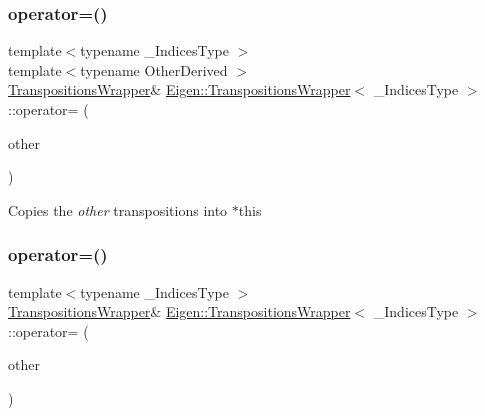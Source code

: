 \subsubsection{\texorpdfstring{operator=()}{operator=()}\hspace{0.1cm}{\footnotesize\ttfamily [1/2]}}
{\footnotesize\ttfamily template$<$typename \+\_\+\+Indices\+Type $>$ \\
template$<$typename Other\+Derived $>$ \\
\mbox{\hyperlink{class_eigen_1_1_transpositions_wrapper}{Transpositions\+Wrapper}}\& \mbox{\hyperlink{class_eigen_1_1_transpositions_wrapper}{Eigen\+::\+Transpositions\+Wrapper}}$<$ \+\_\+\+Indices\+Type $>$\+::operator= (\begin{DoxyParamCaption}\item[{const \mbox{\hyperlink{class_eigen_1_1_transpositions_base}{Transpositions\+Base}}$<$ Other\+Derived $>$ \&}]{other }\end{DoxyParamCaption})\hspace{0.3cm}{\ttfamily [inline]}}

Copies the {\itshape other} transpositions into {\ttfamily $\ast$this} \mbox{\label{class_eigen_1_1_transpositions_wrapper_acb74132efbe10876525cdc3d35c2d382}} 
\subsubsection{\texorpdfstring{operator=()}{operator=()}\hspace{0.1cm}{\footnotesize\ttfamily [2/2]}}
{\footnotesize\ttfamily template$<$typename \+\_\+\+Indices\+Type $>$ \\
\mbox{\hyperlink{class_eigen_1_1_transpositions_wrapper}{Transpositions\+Wrapper}}\& \mbox{\hyperlink{class_eigen_1_1_transpositions_wrapper}{Eigen\+::\+Transpositions\+Wrapper}}$<$ \+\_\+\+Indices\+Type $>$\+::operator= (\begin{DoxyParamCaption}\item[{const \mbox{\hyperlink{class_eigen_1_1_transpositions_wrapper}{Transpositions\+Wrapper}}$<$ \+\_\+\+Indices\+Type $>$ \&}]{other }\end{DoxyParamCaption})\hspace{0.3cm}{\ttfamily [inline]}}

